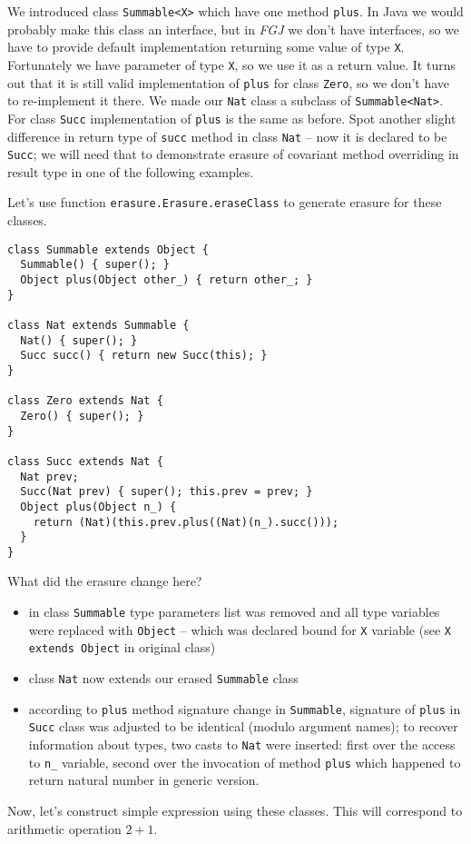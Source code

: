 \documentclass{article}[12pt]
\begin{document}
We introduced class \texttt{Summable<X>} which have one method
\texttt{plus}. In Java we would probably make this class an
interface, but in \emph{FGJ} we don't have interfaces, so we have
to provide default implementation returning some value of type
\texttt{X}. Fortunately we have parameter of type \texttt{X},
so we use it as a return value. It turns out that it is still
valid implementation of \texttt{plus} for class \texttt{Zero},
so we don't have to re-implement it there. We made our
\texttt{Nat} class a subclass of \texttt{Summable<Nat>}. For
class \texttt{Succ} implementation of \texttt{plus} is the same
as before. Spot another slight difference in return type
of \texttt{succ} method in class \texttt{Nat} -- now it is
declared to be \texttt{Succ}; we will need that to demonstrate
erasure of covariant method overriding in result type in one of
the following examples.

Let's use function \texttt{erasure.Erasure.eraseClass} to generate
erasure for these classes.

\begin{verbatim}
class Summable extends Object {
  Summable() { super(); }
  Object plus(Object other_) { return other_; }
}

class Nat extends Summable {
  Nat() { super(); }
  Succ succ() { return new Succ(this); }
}

class Zero extends Nat { 
  Zero() { super(); }
}

class Succ extends Nat {
  Nat prev;
  Succ(Nat prev) { super(); this.prev = prev; }
  Object plus(Object n_) {
    return (Nat)(this.prev.plus((Nat)(n_).succ())); 
  }
}
\end{verbatim}
What did the erasure change here?

\begin{itemize}
\item in class \texttt{Summable} type parameters list was removed
   and all type variables were replaced with \texttt{Object} --
   which was declared bound for \texttt{X} variable (see
   \texttt{X extends Object} in original class)
\item class \texttt{Nat} now extends our erased \texttt{Summable}
  class
\item according to \texttt{plus} method signature change in
  \texttt{Summable}, signature of \texttt{plus} in \texttt{Succ}
  class was adjusted to be identical (modulo argument names);
  to recover information about types, two casts to \texttt{Nat}
  were inserted: first over the access to \texttt{n\_} variable,
  second over the invocation of method \texttt{plus} which
  happened to return natural number in generic version.
\end{itemize}
Now, let's construct simple expression using these classes. This
will correspond to arithmetic operation $2 + 1$.
\end{document}
